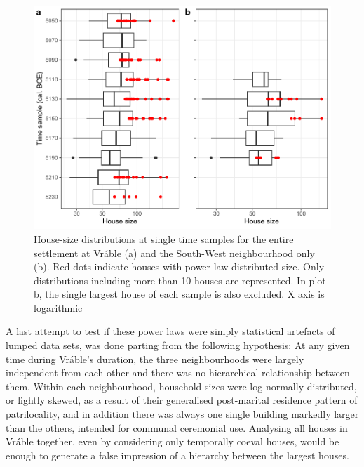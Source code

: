 \documentclass[
  12pt,
]{book}
\begin{document}
\begin{figure}

{\centering \includegraphics[width=0.9\linewidth]{bookdown-demo_files/figure-latex/06-time-box-1} 

}

\caption{House-size distributions at single time samples for the entire settlement at Vráble (a) and the South-West neighbourhood only (b). Red dots indicate houses with power-law distributed size. Only distributions including more than 10 houses are represented. In plot b, the single largest house of each sample is also excluded. X axis is logarithmic}\label{fig:06-time-box}
\end{figure}

A last attempt to test if these power laws were simply statistical artefacts of lumped data sets, was done parting from the following hypothesis: At any given time during Vráble's duration, the three neighbourhoods were largely independent from each other and there was no hierarchical relationship between them. Within each neighbourhood, household sizes were log-normally distributed, or lightly skewed, as a result of their generalised post-marital residence pattern of patrilocality, and in addition there was always one single building markedly larger than the others, intended for communal ceremonial use. Analysing all houses in Vráble together, even by considering only temporally coeval houses, would be enough to generate a false impression of a hierarchy between the largest houses.
\end{document}
